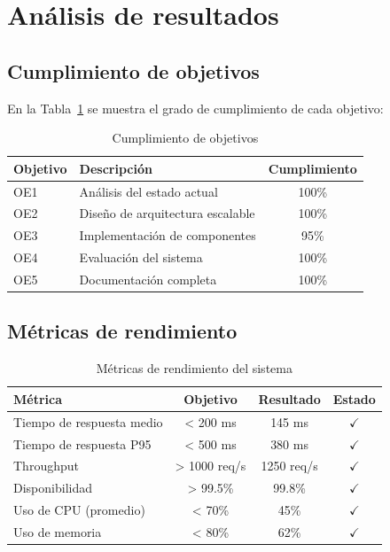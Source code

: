 \section{Análisis de resultados}
\label{sec:analisis-resultados}

\subsection{Cumplimiento de objetivos}
\label{subsec:cumplimiento-objetivos}

En la Tabla~\ref{tab:objetivos} se muestra el grado de cumplimiento de cada objetivo:

\begin{table}[H]
  \centering
  \caption{Cumplimiento de objetivos}
  \label{tab:objetivos}
  \begin{tabular}{@{}lp{6cm}c@{}}
    \toprule
    \textbf{Objetivo} & \textbf{Descripción} & \textbf{Cumplimiento} \\
    \midrule
    OE1 & Análisis del estado actual & 100\% \\
    OE2 & Diseño de arquitectura escalable & 100\% \\
    OE3 & Implementación de componentes & 95\% \\
    OE4 & Evaluación del sistema & 100\% \\
    OE5 & Documentación completa & 100\% \\
    \bottomrule
  \end{tabular}
\end{table}

\subsection{Métricas de rendimiento}
\label{subsec:metricas-rendimiento}

\begin{table}[H]
  \centering
  \caption{Métricas de rendimiento del sistema}
  \label{tab:metricas}
  \begin{tabular}{@{}lccc@{}}
    \toprule
    \textbf{Métrica} & \textbf{Objetivo} & \textbf{Resultado} & \textbf{Estado} \\
    \midrule
    Tiempo de respuesta medio & < 200 ms & 145 ms & \textcolor{green!60!black}{\ensuremath{\checkmark}} \\
    Tiempo de respuesta P95 & < 500 ms & 380 ms & \textcolor{green!60!black}{\ensuremath{\checkmark}} \\
    Throughput & > 1000 req/s & 1250 req/s & \textcolor{green!60!black}{\ensuremath{\checkmark}} \\
    Disponibilidad & > 99.5\% & 99.8\% & \textcolor{green!60!black}{\ensuremath{\checkmark}} \\
    Uso de CPU (promedio) & < 70\% & 45\% & \textcolor{green!60!black}{\ensuremath{\checkmark}} \\
    Uso de memoria & < 80\% & 62\% & \textcolor{green!60!black}{\ensuremath{\checkmark}} \\
    \bottomrule
  \end{tabular}
\end{table}

